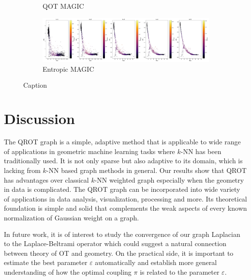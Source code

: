 \documentclass{article}
\begin{document}
\begin{figure}[h!]
\begin{subfigure}{0.9\textwidth}
    \caption{QOT MAGIC}
    \end{subfigure}
    \begin{subfigure}{0.9\textwidth}
    \includegraphics[width=\textwidth]{LaTeX/figures/ENT_MAGIC.jpg}
    \caption{Entropic MAGIC}
    \end{subfigure}
    \caption{Caption}
    \label{fig:cellMAGIC}
\end{figure}


\section{Discussion}\label{sec:Discussion}

The QROT graph is a simple, adaptive method that is applicable to wide range of applications in geometric machine learning tasks where $k$-NN has been traditionally used. It is not only sparse but also adaptive to its domain, which is lacking from $k$-NN based graph methods in general. Our results show that QROT has advantages over classical $k$-NN weighted graph especially when the geometry in data is complicated. The QROT graph can be incorporated into wide variety of applications in data analysis, visualization, processing and more. Its theoretical foundation is simple and solid that complements the weak aspects of every known normalization of Gaussian weight on a graph. 

In future work, it is of interest to study the convergence of our graph Laplacian to the Laplace-Beltrami operator which could suggest a natural connection between theory of OT and geometry. 
On the practical side, it is important to estimate the best parameter $\varepsilon$ automatically and establish more general understanding of how the optimal coupling $\pi$ is related to the parameter $\varepsilon.$


\newpage

{\small


}
\end{document}
